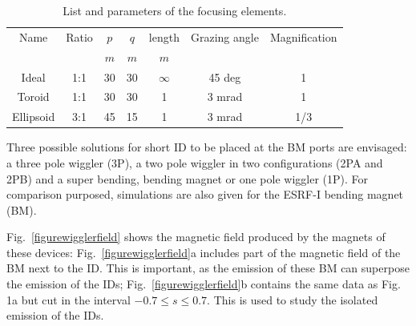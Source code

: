 \documentclass[a4paper,10pt]{article}
\begin{document}
\begin{table}[H]
\label{tablebeamline}
\caption{List and parameters of the focusing elements.}
\vspace{0.3cm}
\begin{tabular}{ccccccc}      %
\hline
Name      & Ratio  & $p$     &  $q$     & length    & Grazing angle & Magnification \\
          &        & $m$     &  $m$     & $m$       &               &  \\
\hline
Ideal     & 1:1    & 30     &  30     & $\infty$  & 45 deg & 1 \\
Toroid    & 1:1    & 30     &  30     & 1         & 3 mrad & 1 \\
Ellipsoid & 3:1    & 45     &  15     & 1         & 3 mrad & 1/3  \\
\hline
\end{tabular}
\end{table}


Three possible solutions for short ID to be placed at the BM ports are envisaged: a three pole wiggler (3P), a two pole wiggler in two
configurations (2PA and 2PB) and a super bending, bending magnet or one pole wiggler (1P). For comparison purposed, simulations are 
also given for the ESRF-I bending magnet (BM).


Fig.~\ref{figurewigglerfield} shows the magnetic field produced by the magnets of these devices: Fig.~\ref{figurewigglerfield}a 
includes part of the magnetic field of the BM next to the ID. This is important, as the emission of these BM can superpose the 
emission of the IDs; Fig.~\ref{figurewigglerfield}b contains the same data as Fig. 1a but cut in the interval $-0.7\leq s \leq 0.7$. 
This is used to study the isolated emission of the IDs. 
\end{document}

